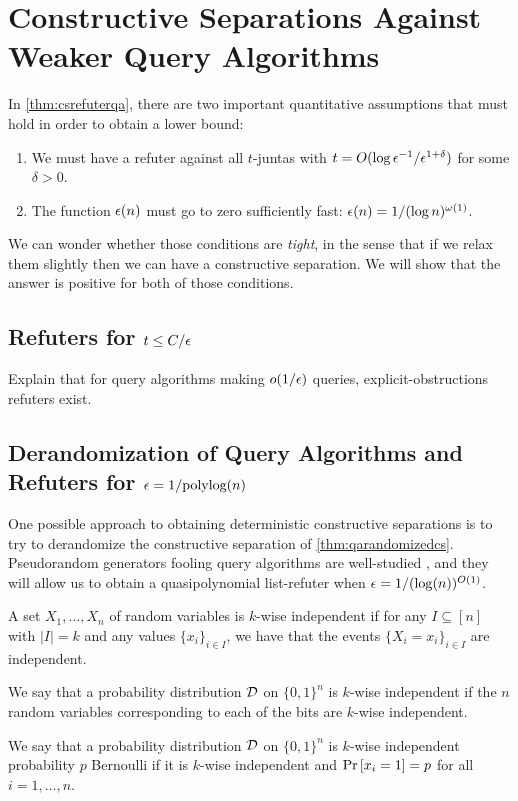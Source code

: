 \thmcsrefuterqa*

\section{Constructive Separations Against Weaker Query Algorithms}

In \cref{thm:csrefuterqa}, there are two important quantitative assumptions
that must hold in order to obtain a lower bound:

\begin{enumerate}
    \item We must have a refuter against all $t$-juntas with $t = O(\log \epsilon^{-1} / \epsilon^{1+\delta})$ for
    some $\delta > 0$.
    \item The function $\epsilon(n)$ must go to zero sufficiently fast: $\epsilon(n) = 1/(\log n)^{\omega(1)}$.
\end{enumerate}

We can wonder whether those conditions are \emph{tight}, in the sense that if we relax them slightly 
then we can have a constructive separation. We will show that the answer is positive for both of
those conditions. 

\subsection{Refuters for $t \leq C/\epsilon$}

Explain that for query algorithms making $o(1/\epsilon)$ queries, explicit-obstructions refuters exist.

\subsection{Derandomization of Query Algorithms and Refuters for $\epsilon = 1/\text{polylog}(n)$}

One possible approach to obtaining deterministic constructive
separations is to try to derandomize 
the constructive separation of \cref{thm:qarandomizedcs}.
Pseudorandom generators fooling query algorithms are well-studied
\cite{Hatami2023}, and they will allow us to obtain a quasipolynomial
list-refuter when $\epsilon = 1/(\log(n))^{O(1)}$.

\begin{definition}
A set $X_1, \ldots, X_n$ of random variables is $k$-wise independent if for any $I \subseteq [n]$
with $|I| = k$ and any values $\{x_i\}_{i\in I}$, we have that the events $\{X_i = x_i\}_{i \in I}$ are independent.

We say that a probability distribution $\mathcal{D}$ on $\{0, 1\}^n$ is $k$-wise independent if the $n$ random variables 
corresponding to each of the bits are $k$-wise independent. 

We say that a probability distribution $\mathcal{D}$ on $\{0, 1\}^n$ is $k$-wise independent probability $p$ Bernoulli
if it is $k$-wise independent and $\text{Pr}\left[x_i = 1\right] = p$ for all $i =1 , \dots, n$. 
\end{definition}

